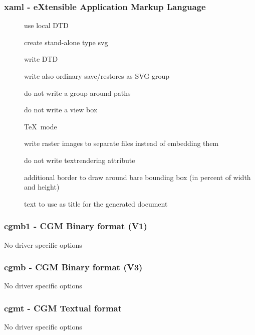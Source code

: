 \documentclass[english,a4paper]{article}
\begin{document}
\subsubsection{xaml - eXtensible Application Markup Language}
\begin{description}
\item[]
use local DTD


\item[]
create stand-alone type svg


\item[]
write DTD


\item[]
write also ordinary save/restores as SVG group


\item[]
do not write a group around paths


\item[]
do not write a view box


\item[]
\TeX\, mode


\item[]
write raster images to separate files instead of embedding them


\item[]
do not write textrendering attribute


\item[]
additional border to draw around bare bounding box (in percent of width and height)


\item[]
text to use as title for the generated document


\end{description}
\subsubsection{cgmb1 - CGM Binary format (V1)}
No driver specific options
\subsubsection{cgmb - CGM Binary format (V3)}
No driver specific options
\subsubsection{cgmt - CGM Textual format}
No driver specific options
\end{document}
